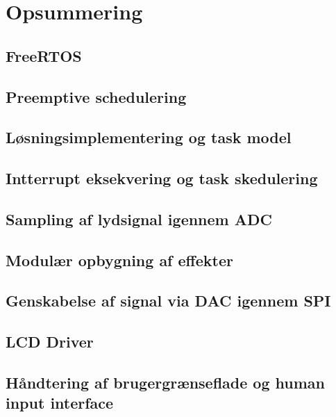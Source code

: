 \section{Opsummering}

\subsection{FreeRTOS}


\subsection{Preemptive schedulering}


\subsection{Løsningsimplementering og task model}


\subsection{Intterrupt eksekvering og task skedulering}


\subsection{Sampling af lydsignal igennem ADC}


\subsection{Modulær opbygning af effekter}


\subsection{Genskabelse af signal via DAC igennem SPI}


\subsection{LCD Driver}


\subsection{Håndtering af brugergrænseflade og human input interface}